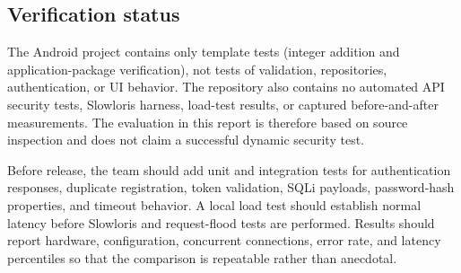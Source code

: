\subsection{Verification status}

The Android project contains only template tests (integer addition and application-package verification), not tests of validation, repositories, authentication, or UI behavior. The repository also contains no automated API security tests, Slowloris harness, load-test results, or captured before-and-after measurements. The evaluation in this report is therefore based on source inspection and does not claim a successful dynamic security test.

Before release, the team should add unit and integration tests for authentication responses, duplicate registration, token validation, SQLi payloads, password-hash properties, and timeout behavior. A local load test should establish normal latency before Slowloris and request-flood tests are performed. Results should report hardware, configuration, concurrent connections, error rate, and latency percentiles so that the comparison is repeatable rather than anecdotal.
